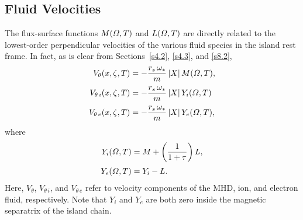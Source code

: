 \documentclass[notitlepage,12pt]{article}
\begin{document}
\subsection{Fluid Velocities}\label{s8.6}
The flux-surface functions $M({\mit\Omega},T)$ and $L({\mit\Omega},T)$ are directly related to the lowest-order perpendicular
velocities of the various fluid species in the island rest frame. In fact, as is clear from Sections~\ref{s4.2}, \ref{s4.3}, and \ref{s8.2}, 
\begin{align}
V_\theta(x,\zeta,T) &= -\frac{r_s\,\omega_\ast}{m}\,|X|\,M({\mit\Omega},T),\\[0.5ex]
V_{\theta\,i}(x,\zeta,T)& = -\frac{r_s\,\omega_\ast}{m}\,|X|\,Y_i({\mit\Omega},T)\\[0.5ex]
V_{\theta\,e}(x,\zeta,T)& = -\frac{r_s\,\omega_\ast}{m}\,|X|\,Y_e({\mit\Omega},T),
\end{align}
where
\begin{align}
Y_i({\mit\Omega},T)&= M+\left(\frac{1}{1+\tau}\right)L,\label{e518}\\[0.5ex]
Y_e({\mit\Omega},T)&= Y_i- L.
\end{align}
Here, $V_\theta$, $V_{\theta\,i}$, and $V_{\theta\,e}$ refer to velocity components of the MHD, ion, and
electron fluid, respectively. Note that $Y_i$ and $Y_e$ are both zero inside the magnetic separatrix of the island chain. 
\end{document}
